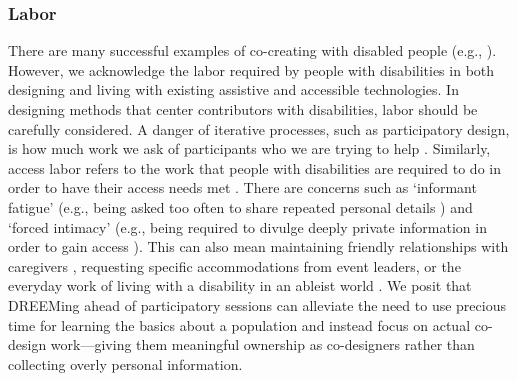 \subsubsection{Labor} \label{Labor}
There are many successful examples of co-creating with disabled people (e.g., \cite{anthonyParticipatoryDesignWorkshop2012,assadMotionBasedGamesParkinson2011,bentonDevelopingIDEASSupporting2012,duvalSpokeItBuildingMobile2018,ellisIncreasingUsabilityOnline2000,ellisParticipatoryDesignInternetbased1998,elorImmersiveVirtualReality2018,karnaDesigningTechnologiesChildren2010,gerlingDesigningMovementbasedPlay2016,grafIGYMInteractiveFloor2019,khaledBridgingSeriousGames2014,malinverniParticipatoryDesignStrategies2014,priorHCIMethodsIncluding2010}). However, we acknowledge the labor required by people with disabilities in both designing and living with existing assistive and accessible technologies. In designing methods that center contributors with disabilities, labor should be carefully considered. A danger of iterative processes, such as participatory design, is how much work we ask of participants who we are trying to help \cite{dourishBeingIteratedAffective2020}. Similarly, access labor refers to the work that people with disabilities are required to do in order to have their access needs met \cite{bennettBiographicalPrototypesReimagining2019,mackWhatWeMean2021,piepzna-samarasinhaCareWorkDreaming2018}. There are concerns such as `informant fatigue' (e.g., being asked too often to share repeated personal details \cite{shinoharaSelfConsciousSelfConfidentDiary2016}) and `forced intimacy' (e.g., being required to divulge deeply private information in order to gain access \cite{mingusForcedIntimacyAbleist2017}). This can also mean maintaining friendly relationships with caregivers \cite{kittayLoveLaborEssays1999}, requesting specific accommodations from event leaders, or the everyday work of living with a disability in an ableist world \cite{hanssonEthicsEnablingTechnology2007a}. We posit that DREEMing ahead of participatory sessions can alleviate the need to use precious time for learning the basics about a population and instead focus on actual co-design work—giving them meaningful ownership as co-designers rather than collecting overly personal information.

